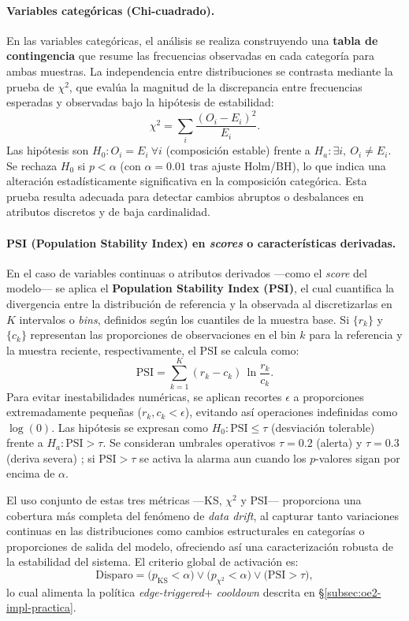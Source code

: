 \paragraph{Variables categóricas (Chi-cuadrado).}  
En las variables categóricas, el análisis se realiza construyendo una \textbf{tabla de contingencia} que resume las frecuencias observadas en cada categoría para ambas muestras.  
La independencia entre distribuciones se contrasta mediante la prueba de \(\chi^2\), que evalúa la magnitud de la discrepancia entre frecuencias esperadas y observadas bajo la hipótesis de estabilidad:
\[
\chi^2 = \sum_{i} \frac{(O_i - E_i)^2}{E_i}.
\]
Las hipótesis son \(H_0: O_i = E_i \ \forall i\) (composición estable) frente a \(H_a: \exists i,\ O_i \neq E_i\).  
Se rechaza \(H_0\) si \(p < \alpha\) (con \(\alpha = 0.01\) tras ajuste Holm/BH), lo que indica una alteración estadísticamente significativa en la composición categórica.  
Esta prueba resulta adecuada para detectar cambios abruptos o desbalances en atributos discretos y de baja cardinalidad.

\paragraph{PSI (Population Stability Index) en \textit{scores} o características derivadas.}  
En el caso de variables continuas o atributos derivados —como el \textit{score} del modelo— se aplica el \textbf{Population Stability Index (PSI)}, el cual cuantifica la divergencia entre la distribución de referencia y la observada al discretizarlas en \(K\) intervalos o \textit{bins}, definidos según los cuantiles de la muestra base.  
Si \(\{r_k\}\) y \(\{c_k\}\) representan las proporciones de observaciones en el bin \(k\) para la referencia y la muestra reciente, respectivamente, el PSI se calcula como:
\[
\mathrm{PSI} = \sum_{k=1}^{K} (r_k - c_k)\,\ln\!\frac{r_k}{c_k}.
\]
Para evitar inestabilidades numéricas, se aplican recortes \(\epsilon\) a proporciones extremadamente pequeñas (\(r_k, c_k < \epsilon\)), evitando así operaciones indefinidas como \(\log(0)\).  
Las hipótesis se expresan como \(H_0: \mathrm{PSI} \le \tau\) (desviación tolerable) frente a \(H_a: \mathrm{PSI} > \tau\).  
Se consideran umbrales operativos \(\tau=0.2\) (alerta) y \(\tau=0.3\) (deriva severa) \citep{Chawla2021,Nguyen2023}; si \(\mathrm{PSI} > \tau\) se activa la alarma aun cuando los $p$-valores sigan por encima de \(\alpha\).  

El uso conjunto de estas tres métricas —KS, $\chi^2$ y PSI— proporciona una cobertura más completa del fenómeno de \textit{data drift}, al capturar tanto variaciones continuas en las distribuciones como cambios estructurales en categorías o proporciones de salida del modelo, ofreciendo así una caracterización robusta de la estabilidad del sistema. El criterio global de activación es:
\[
\text{Disparo} = \big(p_{\mathrm{KS}} < \alpha\big) \lor \big(p_{\chi^2} < \alpha\big) \lor \big(\mathrm{PSI} > \tau\big),
\]
lo cual alimenta la política \textit{edge-triggered}+ \textit{cooldown} descrita en \S\ref{subsec:oe2-impl-practica}.

